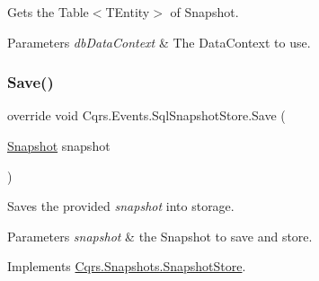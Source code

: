 Gets the Table$<$\+T\+Entity$>$ of Snapshot. 


\begin{DoxyParams}{Parameters}
{\em db\+Data\+Context} & The Data\+Context to use.\\
\hline
\end{DoxyParams}
\mbox{\label{classCqrs_1_1Events_1_1SqlSnapshotStore_ae219c88f6d56fbceef7c738dae824666_ae219c88f6d56fbceef7c738dae824666}} 
\subsubsection{\texorpdfstring{Save()}{Save()}}
{\footnotesize\ttfamily override void Cqrs.\+Events.\+Sql\+Snapshot\+Store.\+Save (\begin{DoxyParamCaption}\item[{\hyperlink{classCqrs_1_1Snapshots_1_1Snapshot}{Snapshot}}]{snapshot }\end{DoxyParamCaption})\hspace{0.3cm}{\ttfamily [virtual]}}



Saves the provided {\itshape snapshot}  into storage. 


\begin{DoxyParams}{Parameters}
{\em snapshot} & the Snapshot to save and store.\\
\hline
\end{DoxyParams}


Implements \hyperlink{classCqrs_1_1Snapshots_1_1SnapshotStore_ae96ea2bb89a0bd7f45544acc37107525_ae96ea2bb89a0bd7f45544acc37107525}{Cqrs.\+Snapshots.\+Snapshot\+Store}.

